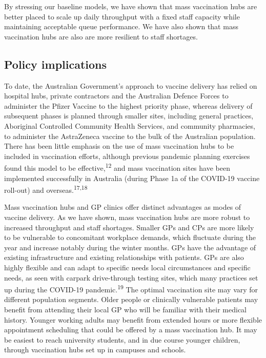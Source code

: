 \documentclass{article}
\begin{document}
By stressing our baseline models, we have shown that mass vaccination
hubs are better placed to scale up daily throughput with a fixed staff
capacity while maintaining acceptable queue performance. We have also
shown that mass vaccination hubs are also are more resilient to staff
shortages.

\hypertarget{policy-implications}{%
\subsection{Policy implications}\label{policy-implications}}

To date, the Australian Government's approach to vaccine delivery has
relied on hospital hubs, private contractors and the Australian Defence
Forces to administer the Pfizer Vaccine to the highest priority phase,
whereas delivery of subsequent phases is planned through smaller sites,
including general practices, Aboriginal Controlled Community Health
Services, and community pharmacies, to administer the AstraZeneca
vaccine to the bulk of the Australian population. There has been little
emphasis on the use of mass vaccination hubs to be included in
vaccination efforts, although previous pandemic planning exercises found
this model to be effective,\textsuperscript{12} and mass vaccination
sites have been implemented successfully in Australia (during Phase 1a
of the COVID-19 vaccine roll-out) and overseas.\textsuperscript{17,18}

Mass vaccination hubs and GP clinics offer distinct advantages as modes
of vaccine delivery. As we have shown, mass vaccination hubs are more
robust to increased throughput and staff shortages. Smaller GPs and CPs
are more likely to be vulnerable to concomitant workplace demands, which
fluctuate during the year and increase notably during the winter months.
GPs have the advantage of existing infrastructure and existing
relationships with patients. GPs are also highly flexible and can adapt
to specific needs local circumstances and specific needs, as seen with
carpark drive-through testing sites, which many practices set up during
the COVID-19 pandemic.\textsuperscript{19} The optimal vaccination site
may vary for different population segments. Older people or clinically
vulnerable patients may benefit from attending their local GP who will
be familiar with their medical history. Younger working adults may
benefit from extended hours or more flexible appointment scheduling that
could be offered by a mass vaccination hub. It may be easiest to reach
university students, and in due course younger children, through
vaccination hubs set up in campuses and schools.
\end{document}
